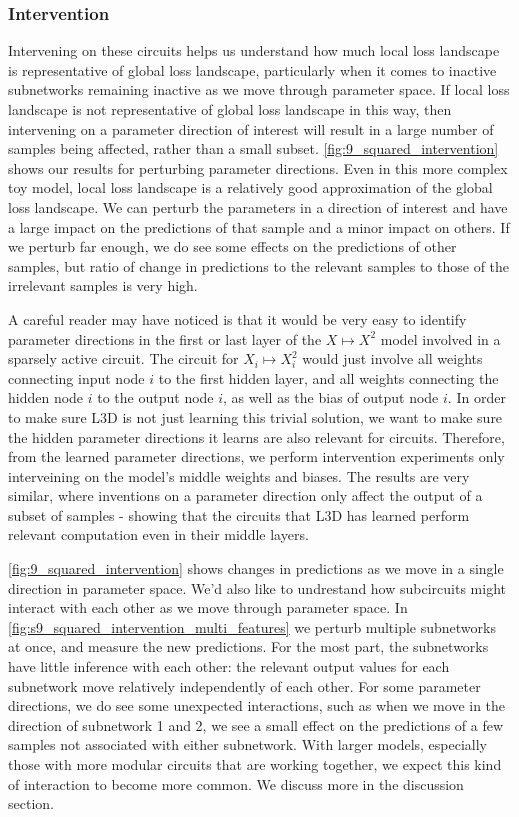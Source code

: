 \documentclass{article}
\theoremstyle{plain}
\theoremstyle{definition}
\theoremstyle{remark}
\begin{document}
\subsubsection{Intervention}

Intervening on these circuits helps us understand how much local loss landscape is representative of global loss landscape, particularly when it comes to inactive subnetworks remaining inactive as we move through parameter space. If local loss landscape is not representative of global loss landscape in this way, then intervening on a parameter direction of interest will result in a large number of samples being affected, rather than a small subset. \ref{fig:9_squared_intervention} shows our results for perturbing parameter directions. Even in this more complex toy model, local loss landscape is a relatively good approximation of the global loss landscape. We can perturb the parameters in a direction of interest and have a large impact on the predictions of that sample and a minor impact on others. If we perturb far enough, we do see some effects on the predictions of other samples, but ratio of change in predictions to the relevant samples to those of the irrelevant samples is very high.

A careful reader may have noticed is that it would be very easy to identify parameter directions in the first or last layer of the $X \mapsto X^2$ model involved in a sparsely active circuit. The circuit for $X_i \mapsto X_i^2$ would just involve all weights connecting input node $i$ to the first hidden layer, and all weights connecting the hidden node $i$ to the output node $i$, as well as the bias of output node $i$. In order to make sure L3D is not just learning this trivial solution, we want to make sure the hidden parameter directions it learns are also relevant for circuits. Therefore, from the learned parameter directions, we perform intervention experiments only interveining on the model's middle weights and biases. The results are very similar, where inventions on a parameter direction only affect the output of a subset of samples - showing that the circuits that L3D has learned perform relevant computation even in their middle layers. 

\ref{fig:9_squared_intervention} shows changes in predictions as we move in a single direction in parameter space. We'd also like to undrestand how subcircuits might interact with each other as we move through parameter space. In \ref{fig:s9_squared_intervention_multi_features} we perturb multiple subnetworks at once, and measure the new predictions. For the most part, the subnetworks have little inference with each other: the relevant output values for each subnetwork move relatively independently of each other. For some parameter directions, we do see some unexpected interactions, such as when we move in the direction of subnetwork 1 and 2, we see a small effect on the predictions of a few samples not associated with either subnetwork. With larger models, especially those with more modular circuits that are working together, we expect this kind of interaction to become more common. We discuss more in the discussion section. 
\end{document}
